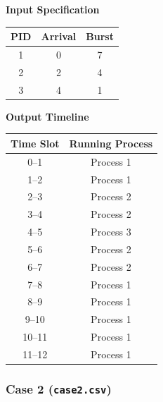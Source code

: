 \documentclass[11pt,a4paper]{article}
\begin{document}
\begin{center}
\begin{minipage}[t]{0.45\textwidth}
\centering
\textbf{Input Specification}
\vspace{0.3em}

\begin{tabular}{ccc}
\toprule
\textbf{PID} & \textbf{Arrival} & \textbf{Burst} \\
\midrule
1 & 0 & 7 \\
2 & 2 & 4 \\
3 & 4 & 1 \\
\bottomrule
\end{tabular}
\end{minipage}
\hfill
\begin{minipage}[t]{0.45\textwidth}
\centering
\textbf{Output Timeline}
\vspace{0.3em}

\begin{tabular}{cc}
\toprule
\textbf{Time Slot} & \textbf{Running Process} \\
\midrule
0--1   & Process 1 \\
1--2   & Process 1 \\
2--3   & Process 2 \\
3--4   & Process 2 \\
4--5   & Process 3 \\
5--6   & Process 2 \\
6--7   & Process 2 \\
7--8   & Process 1 \\
8--9   & Process 1 \\
9--10  & Process 1 \\
10--11 & Process 1 \\
11--12 & Process 1 \\
\bottomrule
\end{tabular}
\end{minipage}
\end{center}

\subsubsection{Case 2 (\texttt{case2.csv})}
\end{document}
